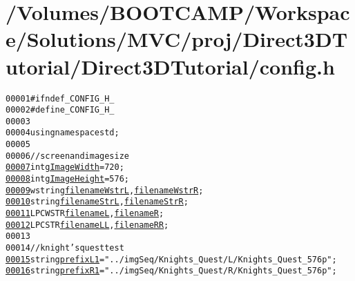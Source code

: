 \hypertarget{config_8h_source}{
\section{/Volumes/BOOTCAMP/Workspace/Solutions/MVC/proj/Direct3DTutorial/Direct3DTutorial/config.h}
}


\begin{footnotesize}\begin{alltt}
00001 \textcolor{preprocessor}{#ifndef \_CONFIG\_H\_}
00002 \textcolor{preprocessor}{}\textcolor{preprocessor}{#define \_CONFIG\_H\_}
00003 \textcolor{preprocessor}{}
00004 \textcolor{keyword}{using namespace }std;
00005 
00006 \textcolor{comment}{// screen and image size}
\hypertarget{config_8h_source_l00007}{}\hyperlink{config_8h_a5dde88e08c88df4ec4c201ab068a909b}{00007} \textcolor{keywordtype}{int} \hyperlink{config_8h_a5dde88e08c88df4ec4c201ab068a909b}{gImageWidth} = 720;
\hypertarget{config_8h_source_l00008}{}\hyperlink{config_8h_af737c15e6577f2676602957bc1ac2ab1}{00008} \textcolor{keywordtype}{int}     \hyperlink{config_8h_af737c15e6577f2676602957bc1ac2ab1}{gImageHeight} = 576;
\hypertarget{config_8h_source_l00009}{}\hyperlink{config_8h_a3b06e388f8261198f0fe86aafca02c41}{00009} wstring \hyperlink{config_8h_a526270325c61739d50933ee42ef9563f}{filenameWstrL},\hyperlink{config_8h_a3b06e388f8261198f0fe86aafca02c41}{filenameWstrR};
\hypertarget{config_8h_source_l00010}{}\hyperlink{config_8h_a19fa526345d6a5020afd0ef78ab58f71}{00010} \textcolor{keywordtype}{string} \hyperlink{config_8h_a65980faa7a98d89e3581eb3ac8777192}{filenameStrL},\hyperlink{config_8h_a19fa526345d6a5020afd0ef78ab58f71}{filenameStrR};
\hypertarget{config_8h_source_l00011}{}\hyperlink{config_8h_ab2d091b589f33f799378b4dbf379e537}{00011} LPCWSTR \hyperlink{config_8h_a9e78e5f975acc8e56d6a84214321a534}{filenameL},\hyperlink{config_8h_ab2d091b589f33f799378b4dbf379e537}{filenameR};
\hypertarget{config_8h_source_l00012}{}\hyperlink{config_8h_ac31be6060769b3c9c0c533e0cf269b28}{00012} LPCSTR \hyperlink{config_8h_a4efd8a98fc24b184ad75501454b3c2b7}{filenameLL},\hyperlink{config_8h_ac31be6060769b3c9c0c533e0cf269b28}{filenameRR};
00013 
00014 \textcolor{comment}{// knight's quest test}
\hypertarget{config_8h_source_l00015}{}\hyperlink{config_8h_a5cfb7ac53a84ac65db638d7926c1216b}{00015} \textcolor{keywordtype}{string} \hyperlink{config_8h_a5cfb7ac53a84ac65db638d7926c1216b}{prefixL1} = \textcolor{stringliteral}{"../imgSeq/Knights\_Quest/L/Knights\_Quest\_576p"};
\hypertarget{config_8h_source_l00016}{}\hyperlink{config_8h_a0cc8c7e0d207c825f13d92d52480abfc}{00016} \textcolor{keywordtype}{string} \hyperlink{config_8h_a0cc8c7e0d207c825f13d92d52480abfc}{prefixR1} = \textcolor{stringliteral}{"../imgSeq/Knights\_Quest/R/Knights\_Quest\_576p"};

\end{alltt}
\end{footnotesize}
